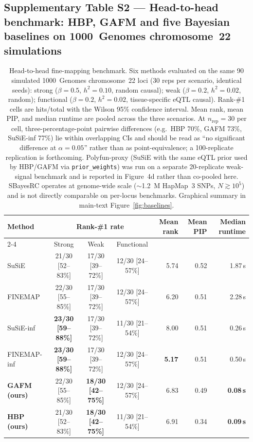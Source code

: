 \clearpage

\subsection*{Supplementary Table S2 --- Head-to-head benchmark: HBP, GAFM and five Bayesian baselines on 1000~Genomes chromosome~22 simulations}

\begin{table}[htbp]
\centering
\footnotesize
\setlength{\tabcolsep}{5pt}
\begin{tabular}{lcccrrr}
\toprule
\multirow{2}{*}{Method} & \multicolumn{3}{c}{Rank-\#1 rate} & \multirow{2}{*}{Mean rank} & \multirow{2}{*}{Mean PIP} & \multirow{2}{*}{Median runtime} \\
\cmidrule(lr){2-4}
                       & Strong & Weak & Functional &           &           & \\
\midrule
SuSiE                              & 21/30 [52--83\%] & 17/30 [39--72\%] & 12/30 [24--57\%] & 5.74 & 0.52 & 1.87\,s \\
FINEMAP                            & 22/30 [55--85\%] & 17/30 [39--72\%] & 12/30 [24--57\%] & 6.20 & 0.51 & 2.28\,s \\
SuSiE-inf                          & \textbf{23/30 [59--88\%]} & 17/30 [39--72\%] & 11/30 [21--54\%] & 8.00 & 0.51 & 0.26\,s \\
FINEMAP-inf                        & \textbf{23/30 [59--88\%]} & 17/30 [39--72\%] & 12/30 [24--57\%] & \textbf{5.17} & 0.51 & 0.50\,s \\
\textbf{GAFM (ours)}               & 22/30 [55--85\%] & \textbf{18/30 [42--75\%]} & 12/30 [24--57\%] & 6.83 & 0.49 & \textbf{0.08\,s} \\
\textbf{HBP (ours)}                & 21/30 [52--83\%] & \textbf{18/30 [42--75\%]} & 11/30 [21--54\%] & 6.91 & 0.34 & \textbf{0.09\,s} \\
\bottomrule
\end{tabular}
\caption{Head-to-head fine-mapping benchmark. Six methods
evaluated on the same 90 simulated 1000~Genomes chromosome~22 loci
(30 reps per scenario, identical seeds): strong
($\beta{=}0.5$, $h^2{=}0.10$, random causal); weak ($\beta{=}0.2$,
$h^2{=}0.02$, random); functional ($\beta{=}0.2$, $h^2{=}0.02$,
tissue-specific eQTL causal). Rank-\#1 cells are
hits/total with the Wilson 95\% confidence interval. Mean rank,
mean PIP, and median runtime are pooled across the three scenarios.
At $n_{\text{rep}}=30$ per cell, three-percentage-point pairwise
differences (e.g.\ HBP 70\%, GAFM 73\%, SuSiE-inf 77\%) lie within
overlapping CIs and should be read as ``no significant difference
at $\alpha=0.05$'' rather than as point-equivalence; a
100-replicate replication is forthcoming. Polyfun-proxy (SuSiE with the same eQTL
prior used by HBP/GAFM via \texttt{prior\_weights}) was run on a
separate 20-replicate weak-signal benchmark and is reported in
Figure~4d rather than co-pooled here. SBayesRC operates at
genome-wide scale ($\sim$1.2~M HapMap~3 SNPs, $N \gtrsim 10^5$) and
is not directly comparable on per-locus benchmarks. Graphical
summary in main-text Figure~\ref{fig:baselines}.}
\label{tab:sup_baselines}
\end{table}

